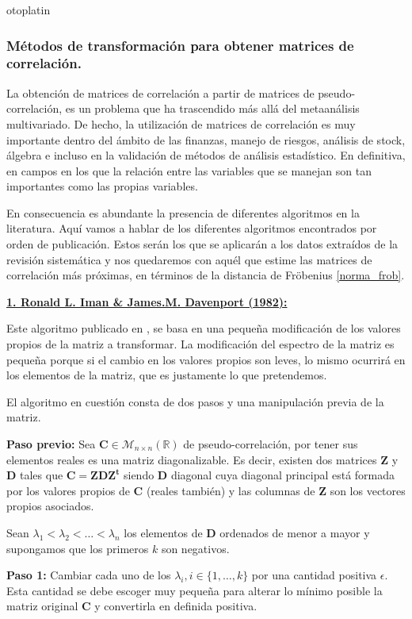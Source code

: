 otoplatin\documentclass[a4paper,openright,12pt]{report}
\begin{document}
\subsubsection{Métodos de transformación para obtener matrices de correlación.}

La obtención de matrices de correlación a partir de matrices de pseudo-correlación, es un problema que ha trascendido más allá del metaanálisis multivariado. De hecho, la utilización de matrices de correlación es muy importante dentro del ámbito de las finanzas, manejo de riesgos, análisis de stock, álgebra e incluso en la validación de métodos de análisis estadístico. En definitiva, en campos en los que la relación entre las variables que se manejan son tan importantes como las propias variables.

En consecuencia es abundante la presencia de diferentes algoritmos en la literatura. Aquí vamos a hablar de los diferentes algoritmos encontrados por orden de publicación. Estos serán los que se aplicarán a los datos extraídos de la revisión sistemática y nos quedaremos con aquél que estime las matrices de correlación más próximas, en términos de la distancia de Fröbenius \ref{norma_frob}.

\textbf{\underline{1. Ronald L. Iman \& James.M. Davenport (1982):}}

Este algoritmo publicado en \cite{Iman1982}, se basa en una pequeña modificación de los valores propios de la matriz a transformar. La modificación del espectro de la matriz es pequeña porque si el cambio en los valores propios son leves, lo mismo ocurrirá en los elementos de la matriz, que es justamente lo que pretendemos.

El algoritmo en cuestión consta de dos pasos y una manipulación previa de la matriz.

\textbf{Paso previo:} Sea $\mathbf{C} \in \mathcal{M}_{n\times n}(\mathbb{R})$ de pseudo-correlación, por tener sus elementos reales es una matriz diagonalizable. Es decir, existen dos matrices $\mathbf{Z}$ y $\mathbf{D}$ tales que $\mathbf{C}=\mathbf{Z}\mathbf{D}\mathbf{Z^{t}}$ siendo $\mathbf{D}$ diagonal cuya diagonal principal está formada por los valores propios de $\mathbf{C}$ (reales también) y las columnas de $\mathbf{Z}$ son los vectores propios asociados.

Sean $\lambda_{1}<\lambda_{2}<\ldots<\lambda_{n}$ los elementos de $\mathbf{D}$ ordenados de menor a mayor y supongamos que los primeros $k$ son negativos.

\textbf{Paso 1:} Cambiar cada uno de los $\lambda_{i}, i \in \lbrace 1,\ldots,k\rbrace$ por una cantidad positiva $\epsilon$. Esta cantidad se debe escoger muy pequeña para alterar lo mínimo posible la matriz original $\mathbf{C}$ y convertirla en definida positiva.
\end{document}
